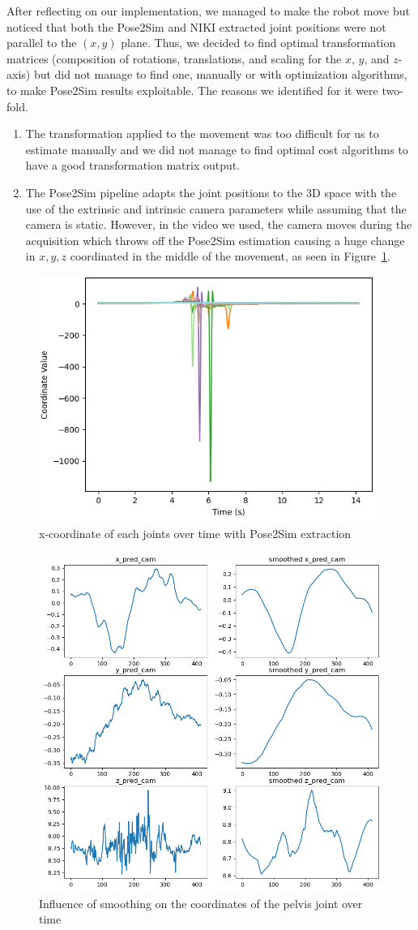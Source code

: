 \documentclass{amsart}
\theoremstyle{definition}
\theoremstyle{plain}
\begin{document}
After reflecting on our implementation, we managed to make the robot move but noticed that both the Pose2Sim and NIKI extracted joint positions were not parallel to the $(x, y)$ plane. Thus, we decided to find optimal transformation matrices (composition of rotations, translations, and scaling for the $x$, $y$, and $z$-axis) but did not manage to find one, manually or with optimization algorithms, to make Pose2Sim results exploitable. The reasons we identified for it were two-fold.

\begin{enumerate}
    \item The transformation applied to the movement was too difficult for us to estimate manually and we did not manage to find optimal cost algorithms to have a good transformation matrix output.
    \item The Pose2Sim pipeline adapts the joint positions to the 3D space with the use of the extrinsic and intrinsic camera parameters while assuming that the camera is static. However, in the video we used, the camera moves during the acquisition which throws off the Pose2Sim estimation causing a huge change in $x,y,z$ coordinated in the middle of the movement, as seen in Figure~\ref{fig:x_coord_pose2sim}.
\end{enumerate}
\begin{figure}
  \includegraphics[width = 0.33 \columnwidth]{img/x_coord_pose2sim.png}
  \caption{x-coordinate of each joints over time with Pose2Sim extraction}\label{fig:x_coord_pose2sim}
\end{figure}
\begin{figure}
  \includegraphics[width = 0.5 \columnwidth]{img/influence_of_smoothing.png}
  \caption{Influence of smoothing on the coordinates of the pelvis joint over time}\label{fig:influence_of_smoothing}
\end{figure}
\end{document}
